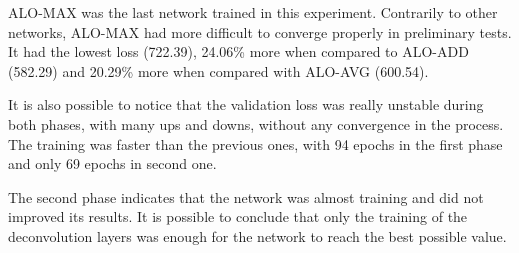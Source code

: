ALO-MAX was the last network trained in this experiment.
Contrarily to other networks, ALO-MAX had more difficult to converge properly in preliminary tests.
It had the lowest loss (722.39), 24.06\% more when compared to ALO-ADD (582.29) and 20.29\% more when compared with ALO-AVG (600.54).



It is also possible to notice that the validation loss was really unstable during both phases, with many ups and downs, without any convergence in the process.
The training was faster than the previous ones, with 94 epochs in the first phase and only 69 epochs in second one.

The second phase indicates that the network was almost training and did not improved its results.
It is possible to conclude that only the training of the deconvolution layers was enough for the network to reach the best possible value.

